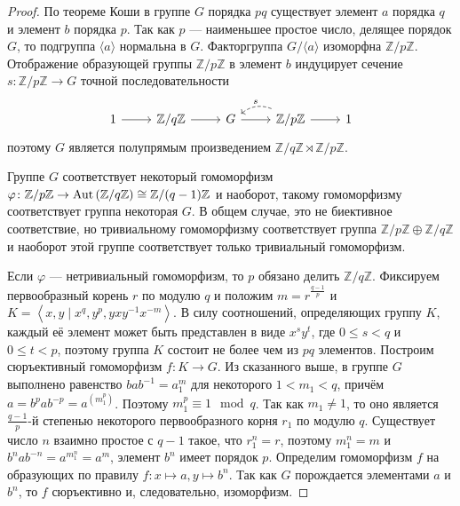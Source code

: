 \begin{proof}
	По теореме Коши в группе $ G $ порядка $ pq $ существует элемент $ a $ порядка $ q $ и элемент $ b $ порядка $ p $.
	Так как $ p $ --- наименьшее простое число, делящее порядок $ G $, 
	то подгруппа $ \langle a \rangle $ нормальна в $ G $.
	Факторгруппа $ G / \langle a \rangle $ изоморфна $ \mathbb{Z}/p\mathbb{Z} $.
	Отображение образующей группы $ \mathbb{Z}/p\mathbb{Z} $ 
	в элемент $ b $ индуцирует сечение $ s \colon \mathbb{Z}/p\mathbb{Z} \to G $
	точной последовательности
	$$ \begin{tikzcd}
	1 \ar{r}{} & \mathbb{Z}/q\mathbb{Z} \ar{r} & G \ar{r} & \mathbb{Z}/p\mathbb{Z} \ar{r} \ar[dashed, bend right=30]{l}[above]{s} & 1
	\end{tikzcd} $$
	поэтому $ G $ является полупрямым произведением $  \mathbb{Z}/q\mathbb{Z} \rtimes \mathbb{Z}/p\mathbb{Z} $.
	
	Группе $ G $ соответствует некоторый гомоморфизм $ \varphi \colon \mathbb{Z}/p\mathbb{Z} \to \mathrm{Aut}\left(\mathbb{Z}/q\mathbb{Z}\right) \cong \mathbb{Z}/(q - 1)\mathbb{Z} $ и наоборот, такому гомоморфизму соответствует группа некоторая $ G $. 
	В общем случае, это не биективное соответствие, но
	тривиальному гомоморфизму соответствует группа $ \mathbb{Z}/p\mathbb{Z} \oplus \mathbb{Z}/q\mathbb{Z} $
	и наоборот этой группе соответствует только тривиальный гомоморфизм.
	
	Если $ \varphi $ --- нетривиальный гомоморфизм, то $ p $ обязано делить $ \mathbb{Z}/q\mathbb{Z} $.
	Фиксируем первообразный корень $ r $ по модулю $ q $ и положим $ m = r^{\tfrac{q - 1}{p}} $
	и $ K = \left< x, y \mid x^q, y^p, yxy^{-1}x^{-m} \right> $.
	В силу соотношений, определяющих группу $ K $, каждый её элемент может быть представлен в виде $ x^sy^t $,
	где $ 0 \leqslant s < q $ и $ 0 \leqslant t < p $, поэтому группа $ K $ состоит не более чем из $ pq $ элементов.
	Построим сюръективный гомоморфизм $ f \colon K \to G $.
	Из сказанного выше, в группе $ G $ выполнено равенство $ bab^{-1} = a^m_1 $ для некоторого $ 1 < m_1 < q $,
	причём $ a = b^pab^{-p} = a^{(m_1^p)} $. Поэтому $ m_1^p \equiv 1 \mod q $. Так как $ m_1 \neq 1 $, 
	то оно является $ \tfrac{q - 1}{p} $-й степенью некоторого первообразного корня $ r_1 $ по модулю $ q $.
	Существует число $ n $ взаимно простое с $ q - 1 $ такое, что $ r_1^n = r $, поэтому $ m_1^n = m $ и 
	$ b^nab^{-n} = a^{m_1^n} = a^{m} $, элемент $ b^n $ имеет порядок $ p $.
	Определим гомоморфизм $ f $ на образующих по правилу $ f \colon x \mapsto a, y \mapsto b^n $.
	Так как $ G $ порождается элементами $ a $ и $ b^n $, то $ f $ сюръективно и, следовательно, изоморфизм.
	
\end{proof}